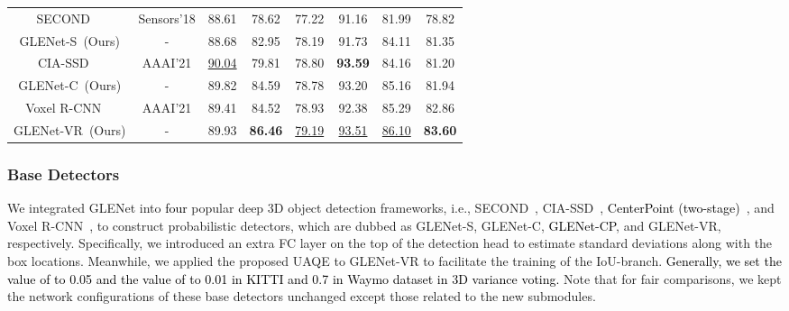 \documentclass[twocolumn]{svjour3}
\newcommand{\revise}[1]{\textcolor{black}{#1}}
\begin{document}
\begin{table*}[htp]
\begin{tabular}{c|c|ccc|ccc}
\hline
SECOND~\citep{yan2018second}~                 & Sensors'18               & 88.61 & 78.62    & 77.22                    & 91.16 & 81.99    & 78.82                  \\
GLENet-S~(Ours)         & -                          & 88.68 & 82.95    & 78.19                    & 91.73 & 84.11    & 81.35                  \\ 
\hline
CIA-SSD~\citep{zheng2021cia}~                & AAAI'21                  & \underline{90.04} & 79.81    & 78.80                    & \textbf{93.59} & 84.16    & 81.20                  \\
GLENet-C~(Ours)         & -                          & 89.82 & 84.59    & 78.78                    & 93.20 & 85.16    & 81.94                  \\ 
\hline
Voxel R-CNN~\citep{deng2021voxel}~            & AAAI'21                  & 89.41 & 84.52    & 78.93                    & 92.38 & 85.29    & 82.86                  \\
GLENet-VR~(Ours)        & -                          & 89.93 & \textbf{86.46}    & \underline{79.19}                    & \underline{93.51} & \underline{86.10}    & \textbf{83.60}                  \\
\hline
\end{tabular}
\end{table*}
\setlength{\tabcolsep}{1.5pt}

\subsubsection{Base Detectors} We integrated GLENet into \revise{four} popular deep 3D object detection frameworks, i.e., SECOND~\citep{yan2018second}, CIA-SSD~\citep{zheng2021cia}, \revise{CenterPoint (two-stage)}~\citep{yin2021center},  and Voxel R-CNN~\citep{deng2021voxel}, to construct probabilistic detectors, which are dubbed as GLENet-S, GLENet-C, \revise{GLENet-CP}, and GLENet-VR, respectively. Specifically, we introduced an extra FC layer on the top of the detection head to estimate standard deviations along with the box locations. Meanwhile, we applied the proposed UAQE to GLENet-VR to facilitate the training of the IoU-branch. \revise{Generally, we set the value of  to 0.05 and the value of  to 0.01 in KITTI and 0.7 in Waymo dataset in 3D variance voting.} Note that for fair comparisons, we kept the network configurations of these base detectors unchanged except those related to the new submodules.
\end{document}
